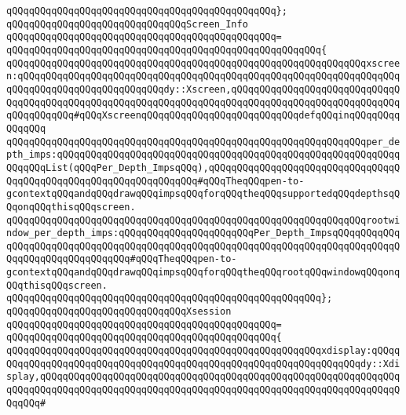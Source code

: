 \verb|qQQqqQQqqQQqqQQqqQQqqQQqqQQqqQQqqQQqqQQqqQQqqQQq};|\newline
\newline
\verb|qQQqqQQqqQQqqQQqqQQqqQQqqQQqqQQqScreen_Info|\newline
\verb|qQQqqQQqqQQqqQQqqQQqqQQqqQQqqQQqqQQqqQQqqQQqqQQq=|\newline
\verb|qQQqqQQqqQQqqQQqqQQqqQQqqQQqqQQqqQQqqQQqqQQqqQQqqQQqqQQq{|\newline
\verb|qQQqqQQqqQQqqQQqqQQqqQQqqQQqqQQqqQQqqQQqqQQqqQQqqQQqqQQqqQQqqQQqxscreen:qQQqqQQqqQQqqQQqqQQqqQQqqQQqqQQqqQQqqQQqqQQqqQQqqQQqqQQqqQQqqQQqqQQqqQQqqQQqqQQqqQQqqQQqqQQqqQQqdy::Xscreen,qQQqqQQqqQQqqQQqqQQqqQQqqQQqqQQqqQQqqQQqqQQqqQQqqQQqqQQqqQQqqQQqqQQqqQQqqQQqqQQqqQQqqQQqqQQqqQQqqQQqqQQqqQQqqQQq#qQQqXscreenqQQqqQQqqQQqqQQqqQQqqQQqqQQqdefqQQqinqQQqqQQqqQQqqQQq|\newline
\verb|qQQqqQQqqQQqqQQqqQQqqQQqqQQqqQQqqQQqqQQqqQQqqQQqqQQqqQQqqQQqqQQqper_depth_imps:qQQqqQQqqQQqqQQqqQQqqQQqqQQqqQQqqQQqqQQqqQQqqQQqqQQqqQQqqQQqqQQqqQQqList(qQQqPer_Depth_ImpsqQQq),qQQqqQQqqQQqqQQqqQQqqQQqqQQqqQQqqQQqqQQqqQQqqQQqqQQqqQQqqQQqqQQqqQQq#qQQqTheqQQqpen-to-gcontextqQQqandqQQqdrawqQQqimpsqQQqforqQQqtheqQQqsupportedqQQqdepthsqQQqonqQQqthisqQQqscreen.|\newline
\verb|qQQqqQQqqQQqqQQqqQQqqQQqqQQqqQQqqQQqqQQqqQQqqQQqqQQqqQQqqQQqqQQqrootwindow_per_depth_imps:qQQqqQQqqQQqqQQqqQQqqQQqPer_Depth_ImpsqQQqqQQqqQQqqQQqqQQqqQQqqQQqqQQqqQQqqQQqqQQqqQQqqQQqqQQqqQQqqQQqqQQqqQQqqQQqqQQqqQQqqQQqqQQqqQQqqQQqqQQq#qQQqTheqQQqpen-to-gcontextqQQqandqQQqdrawqQQqimpsqQQqforqQQqtheqQQqrootqQQqwindowqQQqonqQQqthisqQQqscreen.|\newline
\verb|qQQqqQQqqQQqqQQqqQQqqQQqqQQqqQQqqQQqqQQqqQQqqQQqqQQqqQQq};|\newline
\newline
\verb|qQQqqQQqqQQqqQQqqQQqqQQqqQQqqQQqXsession|\newline
\verb|qQQqqQQqqQQqqQQqqQQqqQQqqQQqqQQqqQQqqQQqqQQqqQQq=|\newline
\verb|qQQqqQQqqQQqqQQqqQQqqQQqqQQqqQQqqQQqqQQqqQQqqQQq{|\newline
\verb|qQQqqQQqqQQqqQQqqQQqqQQqqQQqqQQqqQQqqQQqqQQqqQQqqQQqqQQqxdisplay:qQQqqQQqqQQqqQQqqQQqqQQqqQQqqQQqqQQqqQQqqQQqqQQqqQQqqQQqqQQqqQQqqQQqdy::Xdisplay,qQQqqQQqqQQqqQQqqQQqqQQqqQQqqQQqqQQqqQQqqQQqqQQqqQQqqQQqqQQqqQQqqQQqqQQqqQQqqQQqqQQqqQQqqQQqqQQqqQQqqQQqqQQqqQQqqQQqqQQqqQQqqQQqqQQqqQQqqQQq#|\newline

